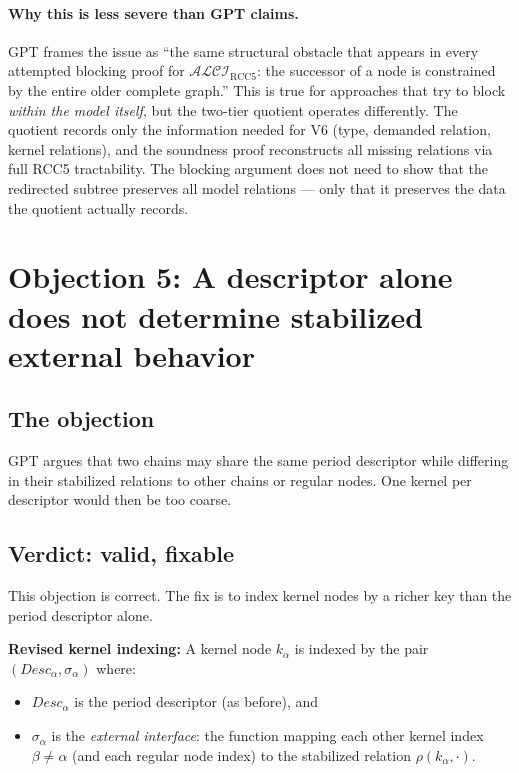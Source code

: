 \documentclass[11pt]{article}
\newcommand{\ALCIRCC}[1]{\mathcal{ALCI}_{\text{RCC#1}}}
\newcommand{\Desc}{\mathit{Desc}}
\begin{document}
\paragraph{Why this is less severe than GPT claims.}
GPT frames the issue as ``the same structural obstacle that appears in
every attempted blocking proof for $\ALCIRCC{5}$: the successor of a
node is constrained by the entire older complete graph.''  This is true
for approaches that try to block \emph{within the model itself}, but the
two-tier quotient operates differently.  The quotient records only the
information needed for V6 (type, demanded relation, kernel relations),
and the soundness proof reconstructs all missing relations via full RCC5
tractability.  The blocking argument does not need to show that the
redirected subtree preserves all model relations --- only that it
preserves the data the quotient actually records.

\section{Objection 5: A descriptor alone does not determine stabilized external behavior}

\subsection{The objection}

GPT argues that two chains may share the same period descriptor while
differing in their stabilized relations to other chains or regular nodes.
One kernel per descriptor would then be too coarse.

\subsection{Verdict: valid, fixable}

This objection is correct.  The fix is to index kernel nodes by a richer
key than the period descriptor alone.

\medskip\noindent\textbf{Revised kernel indexing:}
A kernel node $k_\alpha$ is indexed by the pair
$(\Desc_\alpha, \sigma_\alpha)$ where:
\begin{itemize}
\item $\Desc_\alpha$ is the period descriptor (as before), and
\item $\sigma_\alpha$ is the \emph{external interface}: the function
  mapping each other kernel index $\beta \ne \alpha$ (and each regular
  node index) to the stabilized relation $\rho(k_\alpha, \cdot)$.
\end{itemize}
\end{document}
